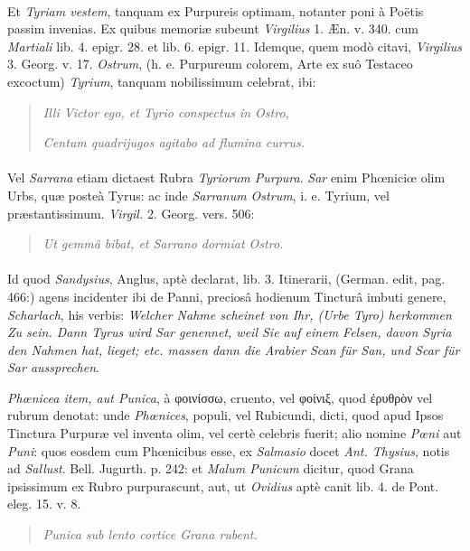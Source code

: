 \documentclass[a4paper, 11pt, oneside, polutonikogreek, german]{article}
\begin{document}
\paragraph{}
Et \emph{Tyriam vestem}, tanquam ex Purpureis optimam, notanter poni à Poëtis passim invenias. Ex quibus memoriæ subeunt \emph{Virgilius} 1. Æn. v. 340. cum \emph{Martiali} lib. 4. epigr. 28. et lib. 6. epigr. 11. Idemque, quem modò citavi, \emph{Virgilius} 3. Georg. v. 17. \emph{Ostrum}, (h. e. Purpureum colorem, Arte ex suô Testaceo excoctum) \emph{Tyrium}, tanquam nobilissimum celebrat, ibi:
\begin{quotation}
\emph{Illi Victor ego, et Tyrio conspectus in Ostro,}

\emph{Centum quadrijugos agitabo ad flumina currus.}
\end{quotation}
\paragraph{}
Vel \emph{Sarrana} etiam dictaest Rubra \emph{Tyriorum Purpura}. \emph{Sar} enim Phœniciœ olim Urbs, quæ posteà Tyrus: ac inde \emph{Sarranum Ostrum}, i. e. Tyrium, vel præstantissimum. \emph{Virgil.} 2. Georg. vers. 506:
\begin{quotation}
\emph{Ut gemmâ bibat, et Sarrano dormiat Ostro.}
\end{quotation}
\paragraph{}
Id quod \emph{Sandysius}, Anglus, aptè declarat, lib. 3. Itinerarii, (German. edit, pag. 466:) agens incidenter ibi de Panni, preciosâ hodienum Tincturâ imbuti genere, \emph{Scharlach}, his verbis: \emph{Welcher Nahme scheinet von Ihr, (Urbe Tyro) herkommen Zu sein. Dann Tyrus wird Sar genennet, weil Sie auf einem Felsen, davon Syria den Nahmen hat, lieget; etc. massen dann die Arabier Scan für San, und Scar für Sar aussprechen}.

\emph{Phœnicea item, aut Punica}, à φοινίσσω, cruento, vel φοίνιξ, quod ἐρυθρὸν vel rubrum denotat: unde \emph{Phœnices}, populi, vel Rubicundi, dicti, quod apud Ipsos Tinctura Purpuræ vel inventa olim, vel certè celebris fuerit; alio nomine \emph{Pœni} aut \emph{Puni}: quos eosdem cum Phœnicibus esse, ex \emph{Salmasio} docet \emph{Ant. Thysius}, notis ad \emph{Sallust}. Bell. Jugurth. p. 242: et \emph{Malum Punicum} dicitur, quod Grana ipsissimum ex Rubro purpurascunt, aut, ut \emph{Ovidius} aptè canit lib. 4. de Pont. eleg. 15. v. 8.
\begin{quotation}
\emph{Punica sub lento cortice Grana rubent.}
\end{quotation}
\end{document}

